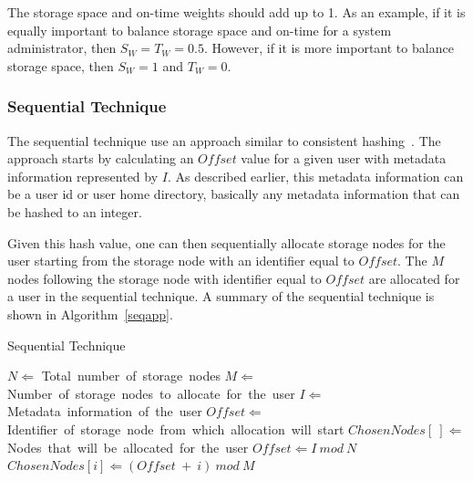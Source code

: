 The storage space and on-time weights should add up to 1. As an example, if it is equally important
to balance storage space and on-time for a system
administrator, then $S_W=T_W=0.5$. However, if it is more important to
balance storage space, then $S_W=1$ and $T_W=0$.

\subsubsection{Sequential Technique}
\label{seqtechnique}
The sequential technique use an approach similar to consistent hashing~\cite{Karger:1997:CHR:258533.258660}.
The approach starts by calculating an $Offset$
value for a given user
with metadata information represented by $I$. As described earlier, 
this metadata information can be a user id or user home directory, basically any metadata information
that can be hashed to an integer.

Given this hash value, one can then sequentially allocate storage nodes for the user starting from
the storage node with an identifier equal to $Offset$.
The $M$ nodes following the storage node with identifier equal to $Offset$ are
allocated for a user in the sequential technique.
A summary of the sequential
technique is shown in Algorithm~\ref{seqapp}.

\begin{algorithm}[!htbp]
\caption{Sequential Technique}
\label{seqapp}
\begin{algorithmic}[1]
    \STATE $N \Leftarrow$ Total\ number\ of\ storage\ nodes
    \STATE $M \Leftarrow$ Number\ of\ storage\ nodes\ to\ allocate\ for\ the\ user
    \STATE $I \Leftarrow$ Metadata\ information\ of\ the\ user
    \STATE $Offset \Leftarrow$ Identifier\ of\ storage\ node\ from\ which\ allocation\ will\ start
    \STATE $ChosenNodes[\ ] \Leftarrow$ Nodes\ that\ will\ be\ allocated\ for\ the\ user
    \STATE $Offset \Leftarrow I\ mod\ N$
        \STATE $ChosenNodes[i] \Leftarrow (Offset\ +\ i)\ mod\ M$
    \ENDFOR
\end{algorithmic}
\end{algorithm}

